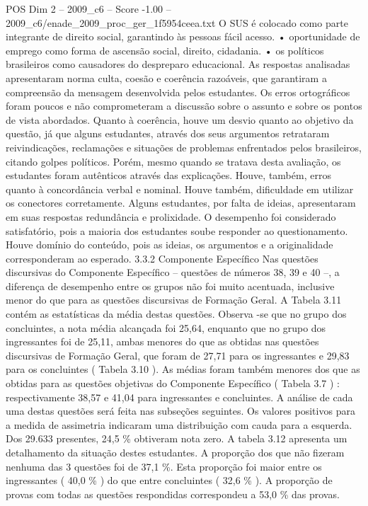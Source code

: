 \begin{textsample}{POS Dim 2 – 2009\_c6 – Score -1.00 – 2009\_c6/enade\_2009\_proc\_ger\_1f5954ceea.txt}
O SUS é colocado como parte integrante de direito social, garantindo às pessoas fácil acesso. • oportunidade de emprego como forma de ascensão social, direito, cidadania. • os políticos brasileiros como causadores do despreparo educacional.
As respostas analisadas apresentaram norma culta, coesão e coerência razoáveis, que garantiram a compreensão da mensagem desenvolvida pelos estudantes.
Os erros ortográficos foram poucos e não comprometeram a discussão sobre o assunto e sobre os pontos de vista abordados.
Quanto à coerência, houve um desvio quanto ao objetivo da questão, já que alguns estudantes, através dos seus argumentos retrataram reivindicações, reclamações e situações de problemas enfrentados pelos brasileiros, citando golpes políticos.
Porém, mesmo quando se tratava desta avaliação, os estudantes foram autênticos através das explicações.
Houve, também, erros quanto à concordância verbal e nominal.
Houve também, dificuldade em utilizar os conectores corretamente.
Alguns estudantes, por falta de ideias, apresentaram em suas respostas redundância e prolixidade.
O desempenho foi considerado satisfatório, pois a maioria dos estudantes soube responder ao questionamento.
Houve domínio do conteúdo, pois as ideias, os argumentos e a originalidade corresponderam ao esperado. 3.3.2 Componente Específico Nas questões discursivas do Componente Específico – questões de números 38, 39 e 40 –, a diferença de desempenho entre os grupos não foi muito acentuada, inclusive menor do que para as questões discursivas de Formação Geral.
A Tabela 3.11 contém as estatísticas da média destas questões.
Observa -se que no grupo dos concluintes, a nota média alcançada foi 25,64, enquanto que no grupo dos ingressantes foi de 25,11, ambas menores do que as obtidas nas questões discursivas de Formação Geral, que foram de 27,71 para os ingressantes e 29,83 para os concluintes ( Tabela 3.10 ).
As médias foram também menores dos que as obtidas para as questões objetivas do Componente Específico ( Tabela 3.7 ) : respectivamente 38,57 e 41,04 para ingressantes e concluintes.
A análise de cada uma destas questões será feita nas subseções seguintes.
Os valores positivos para a medida de assimetria indicaram uma distribuição com cauda para a esquerda.
Dos 29.633 presentes, 24,5 \% obtiveram nota zero.
A tabela 3.12 apresenta um detalhamento da situação destes estudantes.
A proporção dos que não fizeram nenhuma das 3 questões foi de 37,1 \%.
Esta proporção foi maior entre os ingressantes ( 40,0 \% ) do que entre concluintes ( 32,6 \% ).
A proporção de provas com todas as questões respondidas correspondeu a 53,0 \% das provas.

\end{textsample}
